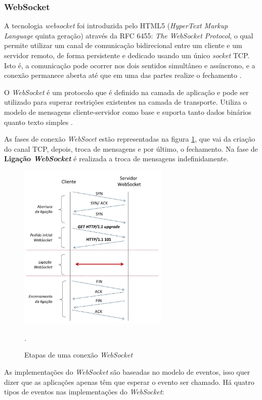\documentclass[
	12pt,				%
	oneside,			%
	a4paper,			%
	english,			%
	brazil				%
	]{abntex2ppgsi}
\begin{document}
\subsubsection{WebSocket}

A tecnologia \textit{websocket} foi introduzida pelo HTML5 (\textit{HyperText Markup Language} quinta geração) através da RFC 6455: \textit{The WebSocket Protocol}, o qual permite utilizar um canal de comunicação bidirecional entre um cliente e um servidor remoto, de forma persistente e dedicado usando um único \textit{socket} TCP. Isto é, a comunicação pode ocorrer nos dois sentidos simultâneo e assíncrono, e a conexão permanece aberta até que em uma das partes realize o fechamento \cite{melnikov2011websocket}.

O \textit{WebSocket} é um protocolo que é definido na camada de aplicação e pode ser utilizado para superar restrições existentes na camada de transporte. Utiliza o modelo de mensagens cliente-servidor como base e suporta tanto dados binários quanto texto simples \cite{themudo2014implementaccao}.

As fases de conexão \textit{WebSocet} estão representadas na figura \ref{fig:etapas_ws}, que vai da criação do canal TCP, depois, troca de mensagens e por último, o fechamento. Na fase de \textbf{Ligação \textit{WebSocket}} é realizada a troca de mensagens indefinidamente.

\begin{figure}[h!]
	\centering
	\includegraphics[height=8cm]{images/etapas_ws.png}
	\caption{Etapas de uma conexão \textit{WebSocket} \cite{themudo2014implementaccao}}.
	\label{fig:etapas_ws}
\end{figure}

As implementações do \textit{WebSocket} são baseadas no modelo de eventos, isso quer dizer que as aplicações apenas têm que esperar o evento ser chamado. Há quatro tipos de eventos nas implementações do \textit{WebSocket}:
 
\end{document}
